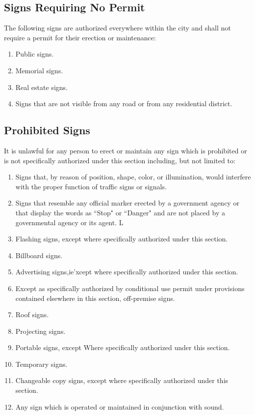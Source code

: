 \subsection{Signs Requiring No Permit}
The following signs are authorized everywhere within the city and shall not require a permit for their erection or maintenance:
\begin{enumerate}[{\indent}1)]
    \item Public signs.
    \item Memorial signs.
    \item Real estate signs.
    \item Signs that are not visible from any road or from any residential district.
\end{enumerate}
\subsection{Prohibited Signs}
It is unlawful for any person to erect or maintain any sign which is prohibited or is not specifically authorized under this section including, but not limited to:
\begin{enumerate}[{\indent}1)]
    \item Signs that, by reason of position, shape, color, or illumination, would interfere with the proper function of traffic signs or signals.
    \item Signs that resemble any official marker erected by a government agency or that display the words as “Stop" or “Danger" and are not placed by a governmental agency or its agent. L
    \item Flashing signs, except where specifically authorized under this section.
    \item Billboard signs.
    \item Advertising signs,ie'xcept where specifically authorized under this section.
    \item Except as specifically authorized by conditional use permit under provisions contained elsewhere in this section, off-premise signs.
    \item Roof signs.
    \item Projecting signs.
    \item Portable signs, except Where specifically authorized under this section.
    \item Temporary signs.
    \item Changeable copy signs, except where specifically authorized under this section.
    \item Any sign which is operated or maintained in conjunction with sound.
\end{enumerate}
